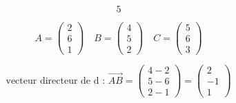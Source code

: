 \documentclass{article}
\begin{document}
\[
\text{5}
\]

\[
A = \begin{pmatrix} 2 \\ 6 \\ 1 \end{pmatrix} \quad B = \begin{pmatrix} 4 \\ 5 \\ 2 \end{pmatrix} \quad C = \begin{pmatrix} 5 \\ 6 \\ 3 \end{pmatrix}
\]

\[
\text{vecteur directeur de d : } \vec{AB} = \begin{pmatrix} 4-2 \\ 5-6 \\ 2-1 \end{pmatrix} = \begin{pmatrix} 2 \\ -1 \\ 1 \end{pmatrix}
\]
\end{document}
